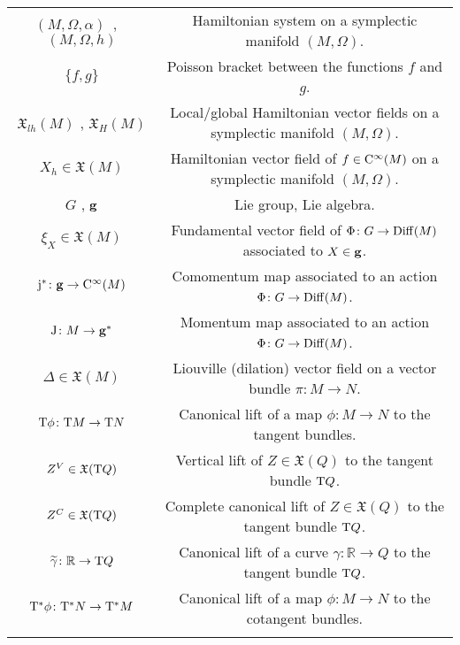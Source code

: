 \documentclass[12pt]{report}
\def\vf{\mathfrak X}
\def\Real{\mathbb{R}}
\def\Tan{{\rm T}}
\def\Cinfty{{\rm C}^\infty}
\begin{document}
\begin{center}
{\begin{tabular}{|c|c|}
$(M,\Omega,\alpha)$\ , \ $(M,\Omega,h)$ & Hamiltonian system on a symplectic manifold $(M,\Omega)$. \\
$\{ f,g\}$ & Poisson bracket between the functions $f$ and $g$. \\
$\vf_{lh} (M)$ , $\vf_H (M)$ & Local/global Hamiltonian vector fields on a symplectic manifold $(M,\Omega)$. \\
$X_h\in\vf(M)$ &
Hamiltonian vector field of $f\in\Cinfty(M)$
on a symplectic manifold $(M,\Omega)$. \\
$G$ , ${\bf g}$ & Lie group, Lie algebra. \\
$\xi_X\in\vf(M)$ & Fundamental vector field of $\Phi\colon G\to{\rm Diff}(M)$ associated to $X\in{\bf g}$. \\
${\rm j}^*\colon{\bf g}\to\Cinfty(M)$ & Comomentum map associated to an action $\Phi\colon G\to{\rm Diff}(M)$.  \\
${\rm J}\colon M\to{\bf g}^*$ & Momentum map associated to an action $\Phi\colon G\to{\rm Diff}(M)$.  \\
$\Delta\in\vf(M)$ & Liouville (dilation) vector field on a vector bundle $\pi\colon M\to N$. \\
$\Tan\phi\colon\Tan M\to\Tan N$ & Canonical lift of a map $\phi\colon M\to N$ to the tangent bundles.  \\
$Z^V\in\vf(\Tan Q)$ & Vertical lift of $Z\in\vf(Q)$ to the tangent bundle $\Tan Q$.  \\
$Z^C\in\vf(\Tan Q)$ & Complete canonical lift of $Z\in\vf(Q)$ to the tangent bundle $\Tan Q$.  \\
$\widetilde\gamma\colon\Real\to\Tan Q$ & Canonical lift of a curve $\gamma\colon\Real\to Q$ to the tangent bundle $\Tan Q$.  \\
$\Tan^*\phi\colon\Tan^*N\to\Tan^*M$ & Canonical lift of a map $\phi\colon M\to N$ to the cotangent bundles.  \\
 & \\
\hline
\end{tabular}
}
\end{center}
\end{document}
